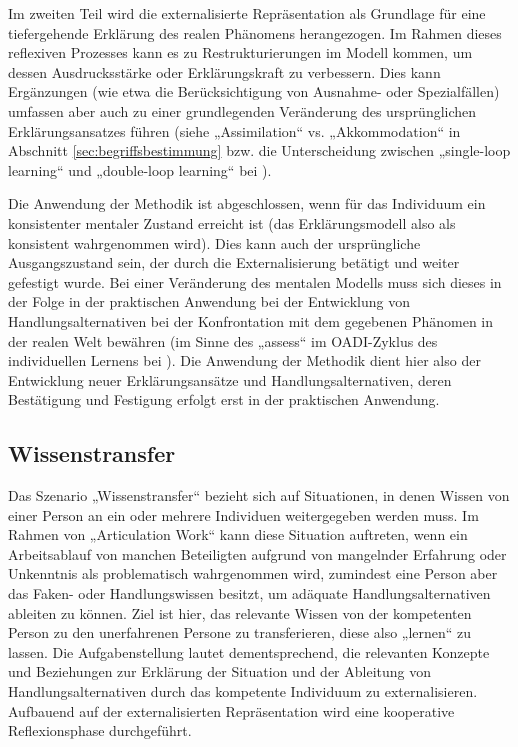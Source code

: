 Im zweiten Teil wird die externalisierte Repräsentation als Grundlage für eine tiefergehende Erklärung des realen Phänomens herangezogen. Im Rahmen dieses reflexiven Prozesses kann es zu Restrukturierungen im Modell kommen, um dessen Ausdrucksstärke oder Erklärungskraft zu verbessern. Dies kann Ergänzungen (wie etwa die Berücksichtigung von Ausnahme- oder Spezialfällen) umfassen aber auch zu einer grundlegenden Veränderung des ursprünglichen Erklärungsansatzes führen (siehe „Assimilation“ vs. „Akkommodation“ in Abschnitt \ref{sec:begriffsbestimmung} bzw. die Unterscheidung zwischen „single-loop learning“ und „double-loop learning“ bei \citet{Argyris76}).

Die Anwendung der Methodik ist abgeschlossen, wenn für das Individuum ein konsistenter mentaler Zustand erreicht ist (das Erklärungsmodell also als konsistent wahrgenommen wird). Dies kann auch der ursprüngliche Ausgangszustand sein, der durch die Externalisierung betätigt und weiter gefestigt wurde. Bei einer Veränderung des mentalen Modells muss sich dieses in der Folge in der praktischen Anwendung bei der Entwicklung von Handlungsalternativen bei der Konfrontation mit dem gegebenen Phänomen in der realen Welt bewähren (im Sinne des „assess“ im \gls{OADI}-Zyklus des individuellen Lernens bei \citet{Kim93}). Die Anwendung der Methodik dient hier also der Entwicklung neuer Erklärungsansätze und Handlungsalternativen, deren Bestätigung und Festigung erfolgt erst in der praktischen Anwendung.


\subsection{Wissenstransfer} %
\label{sub:wissenstransfer}

Das Szenario „Wissenstransfer“ bezieht sich auf Situationen, in denen Wissen von einer Person an ein oder mehrere Individuen weitergegeben werden muss. Im Rahmen von „Articulation Work“ kann diese Situation auftreten, wenn ein Arbeitsablauf von manchen Beteiligten aufgrund von mangelnder Erfahrung oder Unkenntnis als problematisch wahrgenommen wird, zumindest eine Person aber das Faken- oder Handlungswissen besitzt, um adäquate Handlungsalternativen ableiten zu können. Ziel ist hier, das relevante Wissen von der kompetenten Person zu den unerfahrenen Persone zu transferieren, diese also „lernen“ zu lassen. Die Aufgabenstellung lautet dementsprechend, die relevanten Konzepte und Beziehungen zur Erklärung der Situation und der Ableitung von Handlungsalternativen durch das kompetente Individuum zu externalisieren. Aufbauend auf der externalisierten Repräsentation wird eine kooperative Reflexionsphase durchgeführt. 

